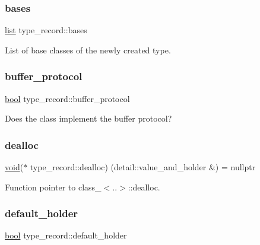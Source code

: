 \subsubsection{\texorpdfstring{bases}{bases}}
{\footnotesize\ttfamily \mbox{\hyperlink{classlist}{list}} type\+\_\+record\+::bases}



List of base classes of the newly created type. 

\mbox{\label{structtype__record_ab5910eea61616c06a02acc36efc21a57}} 
\subsubsection{\texorpdfstring{buffer\_protocol}{buffer\_protocol}}
{\footnotesize\ttfamily \mbox{\hyperlink{asdl_8h_af6a258d8f3ee5206d682d799316314b1}{bool}} type\+\_\+record\+::buffer\+\_\+protocol}



Does the class implement the buffer protocol? 

\mbox{\label{structtype__record_ab2b5fe93f5c5d047014164e931c53c41}} 
\subsubsection{\texorpdfstring{dealloc}{dealloc}}
{\footnotesize\ttfamily \mbox{\hyperlink{_s_d_l__opengles2__gl2ext_8h_ae5d8fa23ad07c48bb609509eae494c95}{void}}($\ast$ type\+\_\+record\+::dealloc) (detail\+::value\+\_\+and\+\_\+holder \&) = nullptr}



Function pointer to class\+\_\+$<$..$>$\+::dealloc. 

\mbox{\label{structtype__record_a22be67a2d89db4dcf7ea338dc435f5e3}} 
\subsubsection{\texorpdfstring{default\_holder}{default\_holder}}
{\footnotesize\ttfamily \mbox{\hyperlink{asdl_8h_af6a258d8f3ee5206d682d799316314b1}{bool}} type\+\_\+record\+::default\+\_\+holder}




